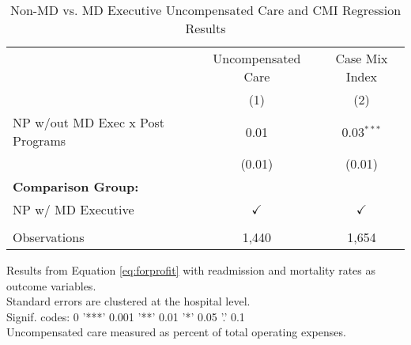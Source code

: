 \begin{table}[ht!]
   \caption{\label{tab:MD_noMD_uncompCMI_fullsample} Non-MD vs. MD Executive Uncompensated Care and CMI Regression Results}
   \bigskip
   \centering
   \begin{tabular}{lcc}
      \toprule
                                       & Uncompensated Care & Case Mix Index\\  
                                       & (1)                & (2)\\  
      \midrule 
      NP w/out MD Exec x Post Programs & 0.01               & 0.03$^{***}$\\   
                                       & (0.01)             & (0.01)\\   
      \textbf{Comparison Group:}       &                    & \\  
      NP w/ MD Executive               & $\checkmark$       & $\checkmark$\\   
       \\
      Observations                     & 1,440              & 1,654\\  
      \bottomrule
   \end{tabular}
   
   \par \raggedright 
   Results from Equation \ref{eq:forprofit} with readmission and mortality rates as outcome variables.\\
   Standard errors are clustered at the hospital level.\\
   Signif. codes: 0 '***' 0.001 '**' 0.01 '*' 0.05 '.' 0.1\\
   Uncompensated care measured as percent of total operating expenses.
\end{table}
